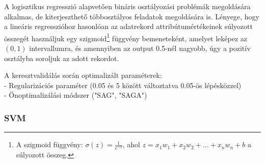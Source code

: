 \documentclass[12pt]{article}
\begin{document}
A logisztikus regresszió alapvetően bináris osztályozási problémák megoldására alkalmas, de kiterjeszthető többosztályos feladatok megoldására is. Lényege, hogy a lineáris regresszióhoz hasonlóan az adatrekord attribútumértékeinek súlyozott összegét használjuk egy szigmoid\footnote{A szigmoid függvény: $\sigma(z)=\frac{1}{e^{-z}}$, ahol $z=x_1w_1+x_2w_2+ \dots +x_nw_n+b$ a súlyozott összeg.} függvény bemeneteként, amelyet leképez az $\left(0,1\right)$ intervallumra, és amennyiben az output 0.5-nél nagyobb, úgy a pozitív osztályba soroljuk az adott rekordot. 

A keresztvalidálás során optimalizált paraméterek: \\
- Regularizációs paraméter (0.05 és 5 között változtatva 0.05-ös lépésközzel) \\
- Önoptimalizálási módszer ("SAG", "SAGA") 

\subsubsection{SVM}

%
\end{document}

